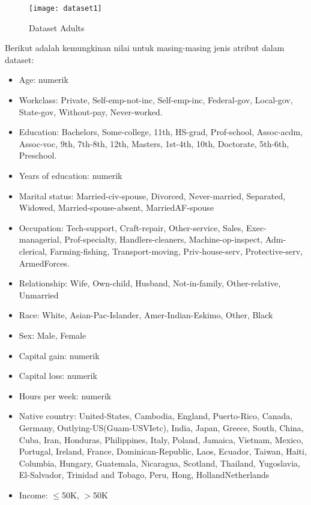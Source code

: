 \begin{figure}[H]
	\centering
	\texttt{[image: dataset1]}
	\caption{Dataset Adults}
	\label{fig:dataset1}
\end{figure}

\noindent Berikut adalah kemungkinan nilai untuk masing-masing jenis atribut dalam dataset:

\begin{itemize}
\item Age: numerik

\item Workclass: Private, Self-emp-not-inc, Self-emp-inc, Federal-gov, Local-gov, State-gov, Without-pay,
Never-worked.

\item Education: Bachelors, Some-college, 11th, HS-grad, Prof-school, Assoc-acdm, Assoc-voc, 9th, 7th-8th, 12th,
Masters, 1st-4th, 10th, Doctorate, 5th-6th, Preschool.

\item Years of education: numerik

\item Marital status: 
Married-civ-spouse, Divorced, Never-married, Separated, Widowed, Married-spouse-absent, MarriedAF-spouse

\item Occupation: Tech-support, Craft-repair, Other-service, Sales, Exec-managerial, Prof-specialty, Handlers-cleaners,
Machine-op-inspect, Adm-clerical, Farming-fishing, Transport-moving, Priv-house-serv, Protective-serv, ArmedForces.

\item Relationship: Wife, Own-child, Husband, Not-in-family, Other-relative, Unmarried

\item Race: White, Asian-Pac-Islander, Amer-Indian-Eskimo, Other, Black

\item Sex: Male, Female

\item Capital gain: numerik

\item Capital loss: numerik

\item Hours per week: numerik

\item Native country: United-States, Cambodia, England, Puerto-Rico, Canada, Germany, Outlying-US(Guam-USVIetc), India, Japan, Greece, South, China, Cuba, Iran, Honduras, Philippines, Italy, Poland, Jamaica, Vietnam, Mexico, Portugal, Ireland, France, Dominican-Republic, Laos, Ecuador, Taiwan, Haiti, Columbia, Hungary, Guatemala, Nicaragua, Scotland, Thailand, Yugoslavia, El-Salvador, Trinidad and Tobago, Peru, Hong, HollandNetherlands

\item Income: $\leq$50K, $>$50K
\end{itemize}


